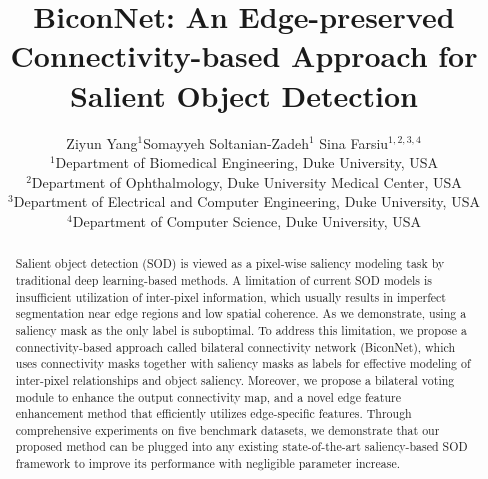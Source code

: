 \documentclass[final]{cvpr}
\begin{document}
\title{BiconNet: An Edge-preserved Connectivity-based Approach for Salient Object Detection}

\author{Ziyun Yang$^{1}$\quad Somayyeh Soltanian-Zadeh$^{1}$ \quad Sina Farsiu$^{  1,2,3,4}$\\
$^{1}$Department of Biomedical Engineering, Duke University, USA\\
$^{2}$Department of Ophthalmology, Duke University Medical Center, USA\\
$^{3}$Department of Electrical and Computer Engineering, Duke University, USA\\
$^{4}$Department of Computer Science, Duke University, USA\\

}

\maketitle


\begin{abstract}
   Salient object detection (SOD) is viewed as a pixel-wise saliency modeling task by traditional deep learning-based methods. A limitation of current SOD models is insufficient utilization of inter-pixel information, which usually results in imperfect segmentation near edge regions and low spatial coherence. As we demonstrate, using a saliency mask as the only label is suboptimal. To address this limitation, we propose a connectivity-based approach called bilateral connectivity network (BiconNet), which uses connectivity masks together with saliency masks as labels for effective modeling of inter-pixel relationships and object saliency. Moreover, we propose a bilateral voting module to enhance the output connectivity map, and a novel edge feature enhancement method that efficiently utilizes edge-specific features. Through comprehensive experiments on five benchmark datasets, we demonstrate that our proposed method can be plugged into any existing state-of-the-art saliency-based SOD framework to improve its performance with negligible parameter increase.
\end{abstract}
\end{document}
